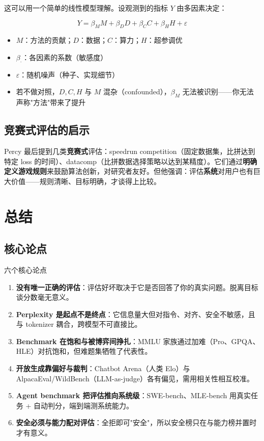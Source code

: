 \documentclass[a4paper]{article}
\begin{document}
这可以用一个简单的线性模型理解。设观测到的指标 $Y$ 由多因素决定：

\[
Y = \beta_M M + \beta_D D + \beta_C C + \beta_H H + \varepsilon
\]

\begin{itemize}
\item $M$：方法的贡献；$D$：数据；$C$：算力；$H$：超参调优
\item $\beta_\cdot$：各因素的系数（敏感度）
\item $\varepsilon$：随机噪声（种子、实现细节）
\item 若不做对照，$D, C, H$ 与 $M$ 混杂（confounded），$\beta_M$ 无法被识别——你无法声称"方法"带来了提升
\end{itemize}

\subsection{竞赛式评估的启示}

Percy 最后提到几类\textbf{竞赛式}评估：speedrun competition（固定数据集，比拼达到特定 loss 的时间）、datacomp（比拼数据选择策略以达到某精度）。它们通过\textbf{明确定义游戏规则}来鼓励算法创新，对研究者友好。但他强调：评估\textbf{系统}对用户也有巨大价值——规则清晰、目标明确，才谈得上比较。

\section{总结}

\subsection{核心论点}

\begin{importantbox}{六个核心论点}
\begin{enumerate}
\item \textbf{没有唯一正确的评估}：评估好坏取决于它是否回答了你的真实问题。脱离目标谈分数毫无意义。
\item \textbf{Perplexity 是起点不是终点}：它信息量大但对指令、对齐、安全不敏感，且与 tokenizer 耦合，跨模型不可直接比。
\item \textbf{Benchmark 在饱和与被博弈间挣扎}：MMLU 家族通过加难（Pro、GPQA、HLE）对抗饱和，但难题集牺牲了代表性。
\item \textbf{开放生成靠偏好与裁判}：Chatbot Arena（人类 Elo）与 AlpacaEval/WildBench（LLM-as-judge）各有偏见，需用相关性相互校准。
\item \textbf{Agent benchmark 把评估推向系统级}：SWE-bench、MLE-bench 用真实任务 + 自动判分，端到端测系统能力。
\item \textbf{安全必须与能力配对评估}：全拒即可"安全"，所以安全榜只在与能力榜并置时才有意义。
\end{enumerate}
\end{importantbox}
\end{document}
